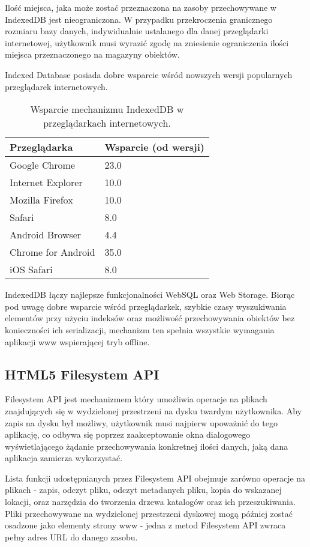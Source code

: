 Ilość miejsca, jaka może zostać przeznaczona na zasoby przechowywane w IndexedDB jest nieograniczona. W przypadku przekroczenia granicznego rozmiaru bazy danych, indywidualnie ustalanego dla danej przeglądarki internetowej, użytkownik musi wyrazić zgodę na zniesienie ograniczenia ilości miejsca przeznaczonego na magazyny obiektów.

Indexed Database posiada dobre wsparcie wśród nowszych wersji popularnych przeglądarek internetowych.

\begin{table}[h]
\centering
    \begin{tabular}{ | p{8cm} | p{6cm} | }
    \hline
    \textbf{Przeglądarka} & \textbf{Wsparcie (od wersji)} \\ \hline
	Google Chrome & 23.0
	\\ \hline
	Internet Explorer & 10.0
	\\ \hline
	Mozilla Firefox & 10.0
	\\ \hline
	Safari & 8.0
	\\ \hline
	Android Browser & 4.4
	\\ \hline
	Chrome for Android & 35.0
	\\ \hline
	iOS Safari & 8.0
	\\ \hline
    \end{tabular}
	\caption{Wsparcie mechanizmu IndexedDB w przeglądarkach internetowych.}
\end{table}

IndexedDB łączy najlepsze funkcjonalności WebSQL oraz Web Storage. Biorąc pod uwagę dobre wsparcie wśród przeglądarkek, szybkie czasy wyszukiwania elementów przy użyciu indeksów oraz możliwość przechowywania obiektów bez konieczności ich serializacji, mechanizm ten spełnia wszystkie wymagania aplikacji www wspierającej tryb offline.

\subsection{HTML5 Filesystem API}
\label{sec:html5filesystemApi}

Filesystem API jest mechanizmem który umożliwia operacje na plikach znajdujących się w wydzielonej przestrzeni na dysku twardym użytkownika. Aby zapis na dysku był możliwy, użytkownik musi najpierw upoważnić do tego aplikację, co odbywa się poprzez zaakceptowanie okna dialogowego wyświetlającego żądanie przechowywania konkretnej ilości danych, jaką dana aplikacja zamierza wykorzystać.

Lista funkcji udostępnianych przez Filesystem API obejmuje zarówno operacje na plikach - zapis, odczyt pliku, odczyt metadanych pliku, kopia do wskazanej lokacji, oraz narzędzia do tworzenia drzewa katalogów oraz ich przeszukiwania. Pliki przechowywane na wydzielonej przestrzeni dyskowej mogą później zostać osadzone jako elementy strony www - jedna z metod Filesystem API zwraca pełny adres URL do danego zasobu.

